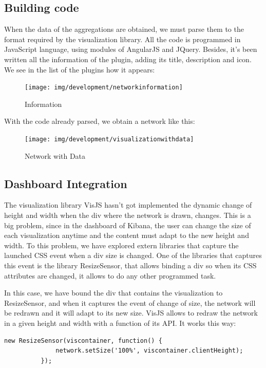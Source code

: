 \documentclass[a4paper, 12pt]{book}
\begin{document}
\subsection{Building code}

When the data of the aggregations are obtained, we must parse them to the format required by the visualization library. All the code is programmed in JavaScript language, using modules of AngularJS and JQuery. Besides, it’s been written all the information of the plugin, adding its title, description and icon. We see in the list of the plugins how it appears:

\begin{figure}[H]
  \centering
  \texttt{[image: img/development/networkinformation]}
  \caption{Information}
  \label{fig:networkinformation}
\end{figure}

With the code already parsed, we obtain a network like this:

\begin{figure}[H]
  \centering
  \texttt{[image: img/development/visualizationwithdata]}
  \caption{Network with Data}
  \label{fig:visualizationwithdata}
\end{figure}

\subsection{Dashboard Integration}
\label{sec:dashboardintegration}

The visualization library VisJS hasn’t got implemented the dynamic change of height and width when the div where the network is drawn, changes. This is a big problem, since in the dashboard of Kibana, the user can change the size of each visualization anytime and the content must adapt to the new height and width.
To this problem, we have explored extern libraries that capture the launched CSS event when a div size is changed. One of the libraries that captures this event is the library ResizeSensor, that allows binding a div so when its CSS attributes are changed, it allows to do any other programmed task.

In this case, we have bound the div that contains the visualization to ResizeSensor, and when it captures the event of change of size, the network will be redrawn and it will adapt to its new size. VisJS allows to redraw the network in a given height and width with a function of its API. It works this way:

\begin{lstlisting}[frame=single]
          new ResizeSensor(viscontainer, function() {
              network.setSize('100%', viscontainer.clientHeight);
          });
\end{lstlisting}
\end{document}
